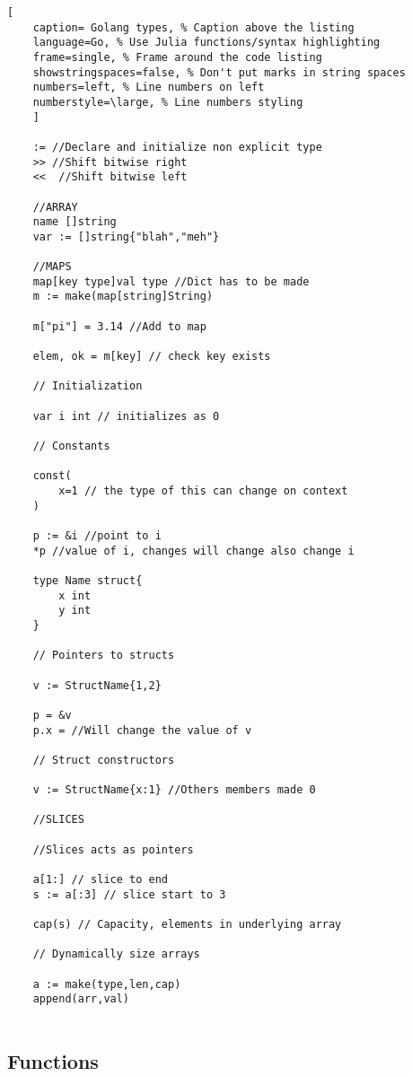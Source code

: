 \documentclass[11pt]{scrartcl} %
\begin{document}
\begin{lstlisting}[
	caption= Golang types, % Caption above the listing
	language=Go, % Use Julia functions/syntax highlighting
	frame=single, % Frame around the code listing
	showstringspaces=false, % Don't put marks in string spaces
	numbers=left, % Line numbers on left
	numberstyle=\large, % Line numbers styling
	]

	:= //Declare and initialize non explicit type
	>> //Shift bitwise right
	<<  //Shift bitwise left

	//ARRAY
	name []string 
	var := []string{"blah","meh"}

	//MAPS
	map[key type]val type //Dict has to be made
	m := make(map[string]String)

	m["pi"] = 3.14 //Add to map

	elem, ok = m[key] // check key exists

	// Initialization

	var i int // initializes as 0

	// Constants

	const(
		x=1 // the type of this can change on context
	)

	p := &i //point to i
	*p //value of i, changes will change also change i

	type Name struct{
		x int
		y int
	}

	// Pointers to structs

	v := StructName{1,2}

	p = &v
	p.x = //Will change the value of v

	// Struct constructors

	v := StructName{x:1} //Others members made 0

	//SLICES

	//Slices acts as pointers

	a[1:] // slice to end
	s := a[:3] // slice start to 3

	cap(s) // Capacity, elements in underlying array

	// Dynamically size arrays

	a := make(type,len,cap)
	append(arr,val)
	
\end{lstlisting}

\newpage

\subsection{Functions}
\end{document}
